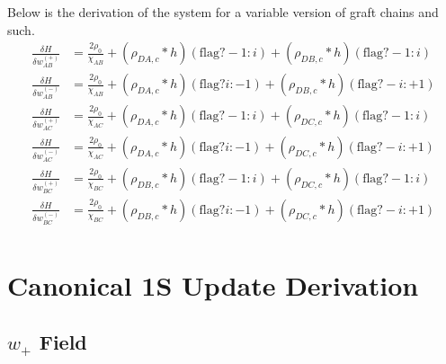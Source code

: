\documentclass{article}
\begin{document}
 Below is the derivation of the system for a variable version of graft chains and such.
  \begin{align*}
    \frac{\delta H}{\delta w_{AB}^{(+)}} 
    &= \frac{2 \rho_0}{\chi_{AB}} 
    + (\rho_{DA,c} * h)(\text{flag} ? -1 : i)
    + (\rho_{DB,c} * h)(\text{flag} ? -1 : i)
    \\
    \frac{\delta H}{\delta w_{AB}^{(-)}} 
    &= \frac{2 \rho_0}{\chi_{AB}} 
    + (\rho_{DA,c} * h)(\text{flag} ? i : -1)
    + (\rho_{DB,c} * h)(\text{flag} ? -i : +1)
    \\
    \frac{\delta H}{\delta w_{AC}^{(+)}} 
    &= \frac{2 \rho_0}{\chi_{AC}} 
    + (\rho_{DA,c} * h)(\text{flag} ? -1 : i)
    + (\rho_{DC,c} * h)(\text{flag} ? -1 : i)
    \\
    \frac{\delta H}{\delta w_{AC}^{(-)}} 
    &= \frac{2 \rho_0}{\chi_{AC}} 
    + (\rho_{DA,c} * h)(\text{flag} ? i : -1)
    + (\rho_{DC,c} * h)(\text{flag} ? -i : +1)
    \\
    \frac{\delta H}{\delta w_{BC}^{(+)}} 
    &= \frac{2 \rho_0}{\chi_{BC}} 
    + (\rho_{DB,c} * h)(\text{flag} ? -1 : i)
    + (\rho_{DC,c} * h)(\text{flag} ? -1 : i)
    \\
    \frac{\delta H}{\delta w_{BC}^{(-)}} 
    &= \frac{2 \rho_0}{\chi_{BC}} 
    + (\rho_{DB,c} * h)(\text{flag} ? i : -1)
    + (\rho_{DC,c} * h)(\text{flag} ? -i : +1)
    \\
  \end{align*}
  
  \section{Canonical 1S Update Derivation}
  
  \subsection{$w_+$ Field}
  
\end{document}
